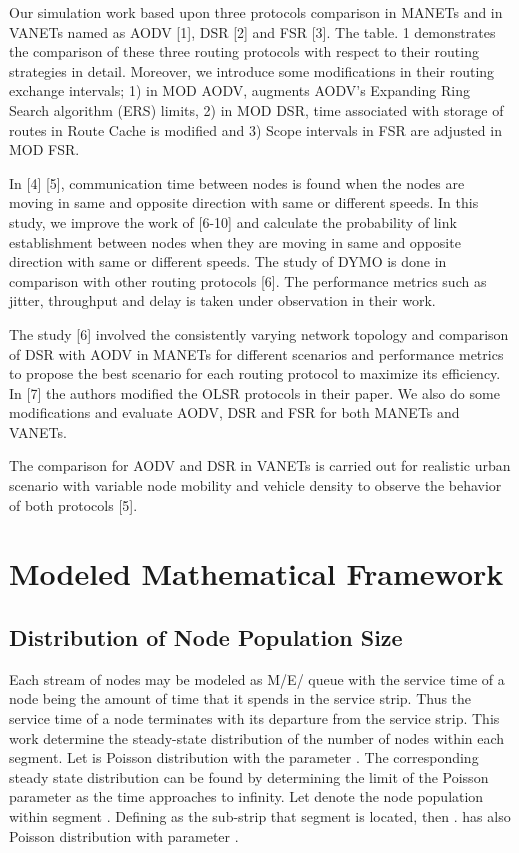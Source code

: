\documentclass[journal]{IEEEtran}
\begin{document}
Our simulation work based upon three protocols comparison in MANETs and in VANETs named as AODV [1], DSR [2] and FSR [3]. The table. 1 demonstrates the comparison of these three routing protocols with respect to their routing strategies in detail. Moreover, we introduce some modifications in their routing exchange intervals; 1) in MOD AODV, augments AODV's Expanding Ring Search algorithm (ERS) limits, 2) in MOD DSR, time associated with storage of routes in Route Cache is modified and 3) Scope intervals in FSR are adjusted in MOD FSR.

In [4] [5], communication time between nodes is found when the nodes are moving in same and opposite direction with same or different speeds. In this study, we improve the work of [6-10] and calculate the probability of link establishment between nodes when they are moving in same and opposite direction with same or different speeds. The study of DYMO is done in comparison with other routing protocols [6]. The performance metrics such as jitter, throughput and delay is taken under observation in their work.

The study [6] involved the consistently varying network topology and comparison of DSR with AODV in MANETs for different scenarios and performance metrics to propose the best scenario for each routing protocol to maximize its efficiency. In [7] the authors modified the OLSR protocols in their paper. We also do some modifications and evaluate AODV, DSR and FSR for both MANETs and VANETs.

The comparison for AODV and DSR in VANETs is carried out for realistic urban scenario with variable node mobility and vehicle density to observe the behavior of both protocols [5].




\section{Modeled Mathematical Framework}
\subsection{Distribution of Node Population Size}

Each stream of nodes may be modeled as M/E/ queue with the service time of a node being the amount of time that it spends in the service strip. Thus the service time of a node terminates with its departure from the service strip.
This work determine the steady-state distribution of the number of nodes within each segment. Let  is Poisson distribution with the parameter . The corresponding steady state distribution can be found by determining the limit of the Poisson parameter as the time approaches to infinity.
Let  denote the node population within segment . Defining  as the sub-strip that segment  is located, then .
 has also Poisson distribution with parameter .
\end{document}
